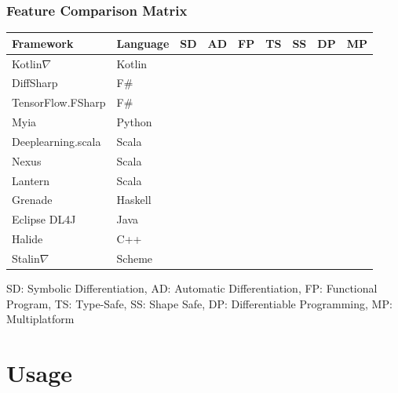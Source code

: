 \documentclass{beamer}
\newcommand{\wmark}{\textcolor{orange}{\ding{45}}}
\newcommand{\cmark}{\textcolor{green!80!black}{\ding{51}}}
\newcommand{\xmark}{\textcolor{red}{\ding{55}}}
\begin{document}
    \begin{frame}
        \frametitle{Feature Comparison Matrix}
            \begin{center}
            \begin{tabular}{lllllllll}
            \textbf{Framework} & \textbf{Language}  & SD     & AD     & FP     & TS     & SS     & DP     & MP     \\ \hline
            Kotlin$\nabla$     & Kotlin             & \cmark & \cmark & \cmark & \cmark & \cmark & \wmark & \wmark \\
            DiffSharp          & F\#                & \xmark & \cmark & \cmark & \cmark & \xmark & \cmark & \xmark \\
            TensorFlow.FSharp  & F\#                & \xmark & \cmark & \cmark & \cmark & \cmark & \cmark & \xmark \\
            Myia               & Python             & \cmark & \cmark & \cmark & \cmark & \cmark & \cmark & \xmark \\
            Deeplearning.scala & Scala              & \xmark & \cmark & \cmark & \cmark & \xmark & \cmark & \xmark \\
            Nexus              & Scala              & \xmark & \cmark & \cmark & \cmark & \cmark & \cmark & \xmark \\
            Lantern            & Scala              & \xmark & \cmark & \cmark & \cmark & \xmark & \cmark & \xmark \\
            Grenade            & Haskell            & \xmark & \cmark & \cmark & \cmark & \cmark & \xmark & \xmark \\
            Eclipse DL4J       & Java               & \xmark & \cmark & \xmark & \cmark & \xmark & \xmark & \xmark \\
            Halide             & C++                & \xmark & \cmark & \xmark & \cmark & \xmark & \cmark & \xmark \\
            Stalin$\nabla$     & Scheme             & \xmark & \cmark & \cmark & \xmark & \xmark & \xmark & \xmark \\
        \end{tabular}
        \end{center}
        \footnotesize{SD: Symbolic Differentiation, AD: Automatic Differentiation, FP: Functional Program, TS: Type-Safe, SS: Shape Safe, DP: Differentiable Programming, MP: Multiplatform}
    \end{frame}

    \section{Usage}
\end{document}
